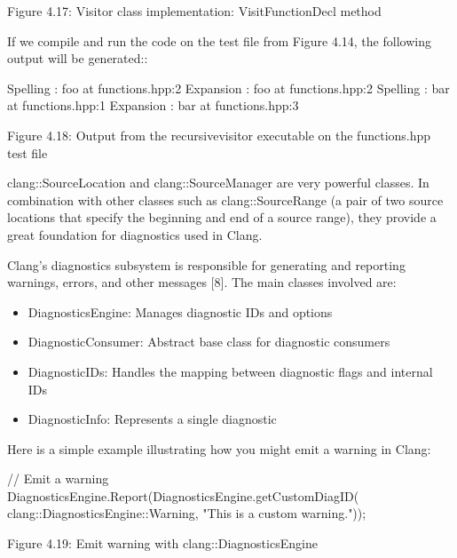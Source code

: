 \begin{center}
Figure 4.17: Visitor class implementation: VisitFunctionDecl method
\end{center}

If we compile and run the code on the test file from Figure 4.14, the following output will be generated::

\begin{shell}
Spelling : foo at functions.hpp:2
Expansion : foo at functions.hpp:2
Spelling : bar at functions.hpp:1
Expansion : bar at functions.hpp:3
\end{shell}

\begin{center}
Figure 4.18: Output from the recursivevisitor executable on the functions.hpp test file
\end{center}

clang::SourceLocation and clang::SourceManager are very powerful classes. In combination with other classes such as clang::SourceRange (a pair of two source locations that specify the beginning and end of a source range), they provide a great foundation for diagnostics used in Clang.


Clang's diagnostics subsystem is responsible for generating and reporting warnings, errors, and other messages [8]. The main classes involved are:

\begin{itemize}
\item
DiagnosticsEngine: Manages diagnostic IDs and options

\item
DiagnosticConsumer: Abstract base class for diagnostic consumers

\item
DiagnosticIDs: Handles the mapping between diagnostic flags and internal IDs

\item
DiagnosticInfo: Represents a single diagnostic
\end{itemize}

Here is a simple example illustrating how you might emit a warning in Clang:

\begin{cpp}
// Emit a warning
DiagnosticsEngine.Report(DiagnosticsEngine.getCustomDiagID(
  clang::DiagnosticsEngine::Warning, "This is a custom warning."));
\end{cpp}

\begin{center}
Figure 4.19: Emit warning with clang::DiagnosticsEngine
\end{center}

